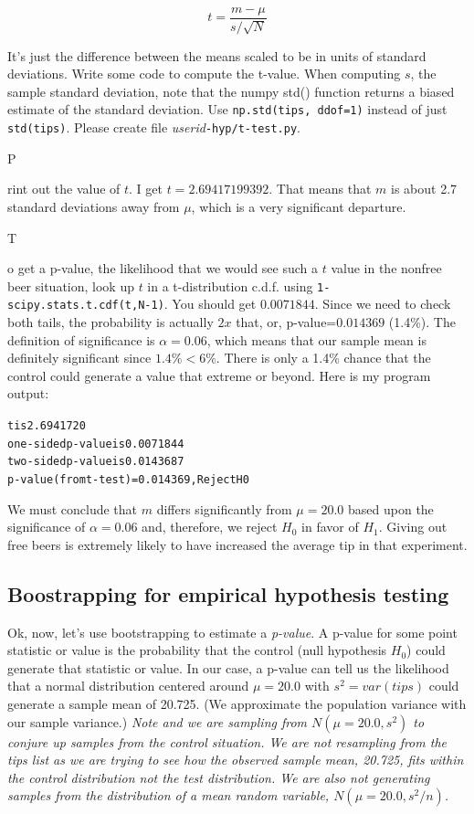 \documentclass[titlepage]{tufte-book}
\newcounter{problem}
\newcommand{\step}[1]{{}
\vspace{4pt} \noindent {\bf \theproblem. }#1\addtocounter{problem}{1}}
\begin{document}
\begin{fullwidth}
\[\tag{t-value}
t = \frac{m - \mu}{s / \sqrt{N}}
\]

\noindent It's just the difference between the means scaled to be in units of standard deviations.  Write some code to compute the t-value. When computing $s$, the sample standard deviation, note that the numpy std() function returns a biased estimate of the standard deviation. Use {\tt np.std(tips, ddof=1)} instead of just {\tt std(tips)}.  Please create file {\em userid}{\tt -hyp/t-test.py}.

\step Print out the value of $t$.  I get $t = 2.69417199392$. That means that $m$ is about 2.7 standard deviations away from $\mu$, which is a very significant departure. 

\step  To get a p-value, the likelihood that we would see such a $t$ value in the nonfree beer situation, look up $t$ in a t-distribution c.d.f. using {\tt 1-scipy.stats.t.cdf(t,N-1)}. You should get $0.0071844$. Since we need to check both tails, the probability is actually $2x$ that, or, p-value=$0.014369$ (1.4\%). The definition of significance is $\alpha = 0.06$, which means that our sample mean is definitely significant since $1.4\% < 6\%$.  There is only a 1.4\% chance that the control could generate a value that extreme or beyond. Here is my program output:

\begin{alltt}
t is 2.6941720
one-sided p-value is 0.0071844
two-sided p-value is 0.0143687
p-value (from t-test) = 0.014369, Reject H0
\end{alltt}

We must conclude that $m$ differs significantly from $\mu = 20.0$ based upon the significance of $\alpha=0.06$ and, therefore, we reject $H_0$ in favor of $H_1$.  Giving out free beers is extremely likely to have increased the average tip in that experiment.

\subsection{Boostrapping for empirical hypothesis testing}

\setcounter{problem}{1}

Ok, now, let's use bootstrapping to estimate a {\em p-value}. A p-value for some point statistic or value is the probability that the control (null hypothesis $H_0$) could generate that statistic or value. In our case, a p-value can tell us the likelihood that a normal distribution centered around $\mu=20.0$ with $s^2=var(tips)$ could generate a sample mean of 20.725. (We approximate the population variance with our sample variance.) {\em Note and we are sampling from $N(\mu=20.0,s^2)$ to conjure up samples from the control situation. We are not resampling from the tips list as we are trying to see how the observed sample mean, 20.725, fits within the control distribution not the test distribution. We are also not generating samples from the distribution of a mean random variable, $N(\mu=20.0,s^2/n)$.}  


\end{fullwidth}
\end{document}
